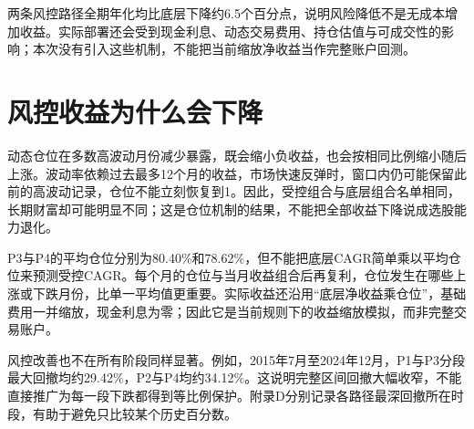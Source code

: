两条风控路径全期年化均比底层下降约6.5个百分点，说明风险降低不是无成本增加收益。实际部署还会受到现金利息、动态交易费用、持仓估值与可成交性的影响；本次没有引入这些机制，不能把当前缩放净收益当作完整账户回测。

\section{风控收益为什么会下降}
动态仓位在多数高波动月份减少暴露，既会缩小负收益，也会按相同比例缩小随后上涨。波动率依赖过去最多12个月的收益，市场快速反弹时，窗口内仍可能保留此前的高波动记录，仓位不能立刻恢复到1。因此，受控组合与底层组合名单相同，长期财富却可能明显不同；这是仓位机制的结果，不能把全部收益下降说成选股能力退化。

P3与P4的平均仓位分别为80.40\%和78.62\%，但不能把底层CAGR简单乘以平均仓位来预测受控CAGR。每个月的仓位与当月收益组合后再复利，仓位发生在哪些上涨或下跌月份，比单一平均值更重要。实际收益还沿用“底层净收益乘仓位”，基础费用一并缩放，现金利息为零；因此它是当前规则下的收益缩放模拟，而非完整交易账户。

风控改善也不在所有阶段同样显著。例如，2015年7月至2024年12月，P1与P3分段最大回撤均约29.42\%，P2与P4均约34.12\%。这说明完整区间回撤大幅收窄，不能直接推广为每一段下跌都得到等比例保护。附录D分别记录各路径最深回撤所在时段，有助于避免只比较某个历史百分数。
